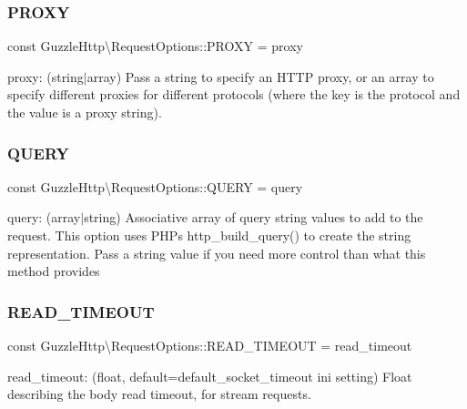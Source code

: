 \subsubsection{\texorpdfstring{P\+R\+O\+XY}{PROXY}}
{\footnotesize\ttfamily const Guzzle\+Http\textbackslash{}\+Request\+Options\+::\+P\+R\+O\+XY = \textquotesingle{}proxy\textquotesingle{}}

proxy\+: (string$\vert$array) Pass a string to specify an H\+T\+TP proxy, or an array to specify different proxies for different protocols (where the key is the protocol and the value is a proxy string). \mbox{\label{classGuzzleHttp_1_1RequestOptions_a6a4f00a9a6a50daeaf4065ead825a228}} 
\subsubsection{\texorpdfstring{Q\+U\+E\+RY}{QUERY}}
{\footnotesize\ttfamily const Guzzle\+Http\textbackslash{}\+Request\+Options\+::\+Q\+U\+E\+RY = \textquotesingle{}query\textquotesingle{}}

query\+: (array$\vert$string) Associative array of query string values to add to the request. This option uses P\+HP\textquotesingle{}s http\+\_\+build\+\_\+query() to create the string representation. Pass a string value if you need more control than what this method provides \mbox{\label{classGuzzleHttp_1_1RequestOptions_ab30a410e803598d3ead7926232b9a2c4}} 
\subsubsection{\texorpdfstring{R\+E\+A\+D\+\_\+\+T\+I\+M\+E\+O\+UT}{READ\_TIMEOUT}}
{\footnotesize\ttfamily const Guzzle\+Http\textbackslash{}\+Request\+Options\+::\+R\+E\+A\+D\+\_\+\+T\+I\+M\+E\+O\+UT = \textquotesingle{}read\+\_\+timeout\textquotesingle{}}

read\+\_\+timeout\+: (float, default=default\+\_\+socket\+\_\+timeout ini setting) Float describing the body read timeout, for stream requests. \mbox{\label{classGuzzleHttp_1_1RequestOptions_af4a4eb08329bb842ff51298041d972ae}} 
